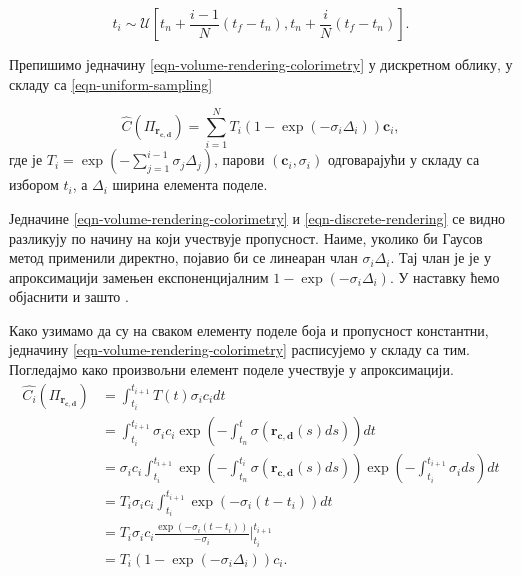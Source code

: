 \documentclass[12pt, a4paper, twoside]{book}
\numberwithin{equation}{chapter}
\numberwithin{theorem}{section}
\numberwithin{definition}{section}
\numberwithin{definitionChapter}{chapter}
\begin{document}
\begin{equation}
	t_i \sim \mathcal{U}\left[t_n + \frac{i - 1}{N}(t_f - t_n), t_n + \frac{i}{N}(t_f -t_n)\right].
	\label{eqn-uniform-sampling}
\end{equation}

Препишимо једначину \ref{eqn-volume-rendering-colorimetry} у дискретном облику, у складу са
\ref{eqn-uniform-sampling}

\begin{equation}
	\hat{C}(\Pi_{\mathbf{r_{c, d}}}) = \sum_{i=1}^{N} T_i (1- \exp(-\sigma_i\Delta_i)) \mathbf{c}_i,
	\label{eqn-discrete-rendering}
\end{equation}
где је $T_i = \exp\left(-\sum_{j=1}^{i-1}\sigma_j\Delta_j\right)$, парови $(\mathbf{c}_i, \sigma_i)$
одговарајући у складу са избором $t_i$, а $\Delta_i$ ширина елемента поделе.

Једначине \ref{eqn-volume-rendering-colorimetry} и \ref{eqn-discrete-rendering} се видно разликују по
начину на који учествује пропусност. Наиме, уколико би Гаусов метод применили директно, појавио би се
линеаран члан $\sigma_i\Delta_i$. Тај члан је је у апроксимацији замењен експоненцијалним
$1 - \exp(-\sigma_i\Delta_i)$. У наставку ћемо објаснити и зашто \cite{volume-rendering}.

Како узимамо да су на сваком елементу поделе боја и пропусност константни,
једначину \ref{eqn-volume-rendering-colorimetry}  расписујемо у складу са тим. Погледајмо како
произвољни елемент поделе учествује у апроксимацији.
\begin{equation}
	\begin{split}
		\hat{C_i}(\Pi_{\mathbf{r_{c, d}}})
			& = \int_{t_i}^{t_{i + 1}} T(t)\sigma_i c_i dt \\
			& = \int_{t_i}^{t_{i + 1}} \sigma_i c_i \exp\left( -\int_{t_n}^{t} \sigma(\mathbf{r_{c, d}}(s)ds) \right)dt \\
			& = \sigma_i c_i \int_{t_i}^{t_{i + 1}} \exp\left( -\int_{t_n}^{t_i} \sigma(\mathbf{r_{c, d}}(s)ds) \right)
				\exp\left( -\int_{t_i}^{t_{i + 1}} \sigma_i ds \right) dt \\
			& = T_i \sigma_i c_i \int_{t_i}^{t_{i + 1}} \exp(-\sigma_i(t - t_i))dt \\
			& = T_i \sigma_i c_i \frac{\exp(-\sigma_i(t - t_i))}{-\sigma_i} \Biggr|_{t_i}^{t_{i + 1}} \\
			& = T_i (1 - \exp(-\sigma_i \Delta_i)) c_i.
	\end{split}
\end{equation}
\end{document}
